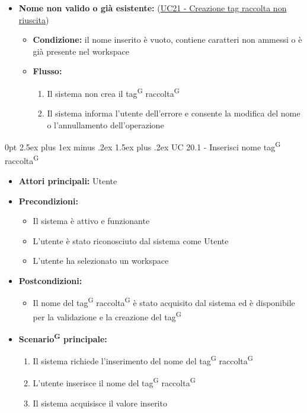 \documentclass[a4paper, 11pt]{article}
\makeatletter
\renewcommand\paragraph{\@startsection{paragraph}{4}
  {0pt}
  {2.5ex plus 1ex minus .2ex}
  {1.5ex plus .2ex}
  {\normalfont\normalsize\bfseries\color{AccentDark}}}
\makeatother
\begin{document}
\begin{itemize}
    \begin{itemize}
        \item \textbf{Nome non valido o già esistente:} (\hyperref[UC21]{UC21 - Creazione tag raccolta non riuscita})
        \begin{itemize}
            \item \textbf{Condizione:} il nome inserito è vuoto, contiene caratteri non ammessi o è già presente nel workspace
            \item \textbf{Flusso:}
            \begin{enumerate}
                \item Il sistema non crea il tag\textsuperscript{G} raccolta\textsuperscript{G}
                \item Il sistema informa l'utente dell'errore e consente la modifica del nome o l'annullamento dell'operazione
            \end{enumerate}
        \end{itemize}
    \end{itemize}
\end{itemize}

\paragraph{UC 20.1 - Inserisci nome tag\textsuperscript{G} raccolta\textsuperscript{G}} \label{UC20.1}
\begin{itemize}
	\item \textbf{Attori principali:} Utente
	\item \textbf{Precondizioni:} 
	\begin{itemize}
		\item Il sistema è attivo e funzionante
		\item L'utente è stato riconosciuto dal sistema come Utente
		\item L'utente ha selezionato un workspace
	\end{itemize}
	\item \textbf{Postcondizioni:} 
	\begin{itemize}
		\item Il nome del tag\textsuperscript{G} raccolta\textsuperscript{G} è stato acquisito dal sistema ed è disponibile per la validazione e la creazione del tag\textsuperscript{G}
	\end{itemize}
	\item \textbf{Scenario\textsuperscript{G} principale:}
	\begin{enumerate}
		\item Il sistema richiede l'inserimento del nome del tag\textsuperscript{G} raccolta\textsuperscript{G}
		\item L'utente inserisce il nome del tag\textsuperscript{G} raccolta\textsuperscript{G}
		\item Il sistema acquisisce il valore inserito
	\end{enumerate}
\end{itemize}
\end{document}
